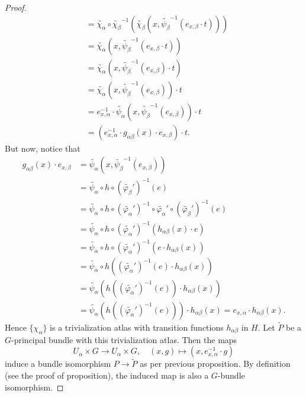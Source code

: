 \documentclass[10pt, a4paper]{article}
\newenvironment{noticeC}{%
  \tcolorbox[%
  notitle,
  empty,
  enhanced,  %
  breakable,
  coltext=black, 
  fontupper=\rmfamily,
  noparskip,
  sharp corners,
  boxrule=-1pt,  %
  frame hidden,
  left=7pt,  %
  right=7pt,
  top=5pt,
  bottom=5pt,
  before skip=2.5ex plus 2pt,
  after skip=2.5ex plus 2pt,
  overlay unbroken and last={%
  },
  ]}
{\endtcolorbox}
\newenvironment{myproof}%
  {\begin{noticeC}\begin{proof}}%
  {\end{proof}\end{noticeC}}
\begin{document}
\begin{myproof}
\begin{align*}
    &= \widetilde{\chi_\alpha} \circ \widetilde{\chi_\beta} ^{-1} ( \widetilde{\chi_\beta} (x, \widetilde{\psi_\beta} ^{-1} (e_{x, \beta} \cdot t)))\\
    &= \widetilde{\chi_\alpha} (x, \widetilde{\psi_\beta} ^{-1} (e_{x, \beta} \cdot t))\\
    &= \widetilde{\chi_\alpha} (x, \widetilde{\psi_\beta} ^{-1} (e_{x, \beta}) \cdot t)\\
    &= \widetilde{\chi_\alpha} (x, \widetilde{\psi_\beta} ^{-1} (e_{x, \beta})) \cdot t\\
    &= e_{x, \alpha} ^{-1} \cdot \widetilde{\psi_\alpha} (x, \widetilde{\psi_\beta} ^{-1}(e_{x, \beta})) \cdot t\\
    &= (e_{x, \alpha} ^{-1} \cdot g_{\alpha \beta} (x) \cdot e_{x, \beta}) \cdot t.
  \end{align*}
  But now, notice that 
  \begin{align*}
    g_{\alpha \beta} (x) \cdot e_{x, \beta} &= \widetilde{\psi_\alpha} (x, \widetilde{\psi_\beta} ^{-1} (e_{x, \beta}))\\ 
    &= \widetilde{\psi_\alpha} \circ h \circ (\widetilde{\varphi_\beta} ')^{-1} (e)\\
    &= \widetilde{\psi_\alpha} \circ h \circ (\widetilde{\varphi_\alpha} ')^{-1} \circ \widetilde{\varphi_\alpha} ' \circ (\widetilde{\varphi_\beta} ')^{-1} (e)\\
    &= \widetilde{\psi_\alpha} \circ h \circ (\widetilde{\varphi_\alpha} ')^{-1} (h_{\alpha \beta} (x) \cdot e)\\
    &= \widetilde{\psi_\alpha} \circ h \circ (\widetilde{\varphi_\alpha} ')^{-1} (e \cdot h_{\alpha \beta} (x))\\
    &= \widetilde{\psi_\alpha} \circ h ((\widetilde{\varphi_\alpha} ')^{-1} (e) \cdot h_{\alpha \beta} (x))\\
    &= \widetilde{\psi_\alpha} (h ((\widetilde{\varphi_\alpha} ')^{-1} (e)) \cdot h_{\alpha \beta} (x))\\
    &= \widetilde{\psi_\alpha} (h ((\widetilde{\varphi_\alpha} ')^{-1} (e))) \cdot h_{\alpha \beta} (x) = e_{x, \alpha} \cdot h_{\alpha \beta} (x).
  \end{align*}
  Hence $\{\chi_\alpha\}$ is a trivialization atlas with transition functions $h_{\alpha \beta}$ in $H$.
  Let $\widetilde{P}$ be a $G$-principal bundle with this trivialization atlas.
  Then the maps 
  $$U_\alpha \times G \to U_\alpha \times G,\quad (x, g) \mapsto (x, e_{x, \alpha} ^{-1} \cdot g)$$
  induce a bundle isomorphism $P \to \widetilde{P}$ as per previous proposition.
  By definition (see the proof of proposition), the induced map is also a $G$-bundle isomorphism.
\end{myproof}
\end{document}
